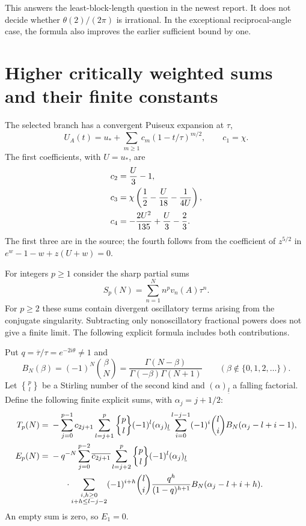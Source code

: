 This answers the least-block-length question in the newest report.
It does not decide whether $\theta(2)/(2\pi)$ is irrational.
In the exceptional reciprocal-angle case, the formula also improves
the earlier sufficient bound by one.

\section{Higher critically weighted sums and their finite constants}
\label{newdiag:sec:finiteparts}

The selected branch has a convergent Puiseux expansion at $\tau$,
\begin{equation}\label{newdiag:eq:puiseux}
 U_A(t)=u_*+\sum_{m\geq1}c_m(1-t/\tau)^{m/2},
 \qquad c_1=\chi.
\end{equation}
The first coefficients, with $U=u_*$, are
\begin{align}
 c_2&=\frac U3-1,\notag\\
 c_3&=\chi\left(\frac12-\frac U{18}-\frac1{4U}\right),\label{newdiag:eq:c1234}\\
 c_4&=-\frac{2U^2}{135}+\frac U3-\frac23.\notag
\end{align}
The first three are in the source; the fourth follows from the
coefficient of $z^{5/2}$ in
$e^w-1-w+z(U+w)=0$.

For integers $p\geq1$ consider the sharp partial sums
\[
 S_p(N)=\sum_{n=1}^N n^p v_n(A)\tau^n.
\]
For $p\geq2$ these sums contain divergent oscillatory terms arising
from the conjugate singularity.  Subtracting only nonoscillatory
fractional powers does not give a finite limit.  The following
explicit formula includes both contributions.

Put $q=\overline\tau/\tau=e^{-2i\theta}\ne1$ and
\[
 B_N(\beta)=(-1)^N\binom\beta N
     =\frac{\Gamma(N-\beta)}{\Gamma(-\beta)\Gamma(N+1)}
       \qquad(\beta\notin\{0,1,2,\ldots\}).
\]
Let $\genfrac{\{}{\}}{0pt}{}{p}{l}$ be a Stirling number of the second
kind and $(\alpha)_{\underline l}$ a falling factorial.  Define the
following finite explicit sums, with $\alpha_j=j+1/2$:
\begin{align}
 T_p(N)={}&-\sum_{j=0}^{p-1}c_{2j+1}
   \sum_{l=j+1}^{p}\genfrac{\{}{\}}{0pt}{}{p}{l}
       (-1)^l(\alpha_j)_{\underline l}
   \sum_{i=0}^{l-j-1}(-1)^i\binom li
       B_N(\alpha_j-l+i-1),\label{newdiag:eq:T}\\
 E_p(N)={}&-q^{-N}\sum_{j=0}^{p-2}\overline{c_{2j+1}}
   \sum_{l=j+2}^{p}\genfrac{\{}{\}}{0pt}{}{p}{l}
       (-1)^l(\alpha_j)_{\underline l}\notag\\
 &\hspace{6mm}\cdot
   \sum_{\substack{i,h\geq0\\i+h\leq l-j-2}}
       (-1)^{i+h}\binom li\frac{q^h}{(1-q)^{h+1}}
       B_N(\alpha_j-l+i+h).
       \label{newdiag:eq:E}
\end{align}
An empty sum is zero, so $E_1=0$.

